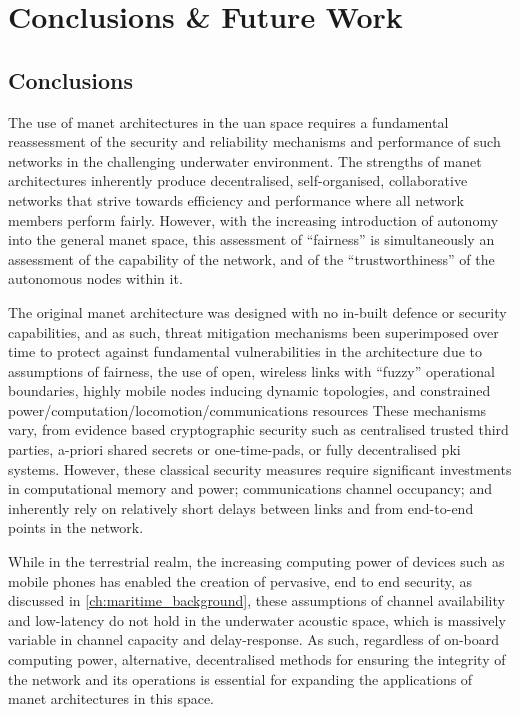 \def\ChapterTitle{Conclusions \& Future Work}

	\chapter{\ChapterTitle}
	\label{ch:conclusion}
	\lhead{Chapter \thechapter. \emph{\ChapterTitle}} %

\section{Conclusions}

The use of \gls{manet} architectures in the \gls{uan} space requires a fundamental reassessment of the security and reliability mechanisms and performance of such networks in the challenging underwater environment.
The strengths of \gls{manet} architectures inherently produce decentralised, self-organised, collaborative networks that strive towards efficiency and performance where all network members perform fairly.
However, with the increasing introduction of autonomy into the general \gls{manet} space, this assessment of ``fairness'' is simultaneously an assessment of the capability of the network, and of the ``trustworthiness'' of the autonomous nodes within it.

The original \gls{manet} architecture was designed with no in-built defence or security capabilities, and as such, threat mitigation mechanisms been superimposed over time to protect against fundamental vulnerabilities in the architecture due to assumptions of fairness, the use of open, wireless links with ``fuzzy'' operational boundaries, highly mobile nodes inducing dynamic topologies, and constrained power/computation/locomotion/communications resources
These mechanisms vary, from evidence based cryptographic security such as centralised trusted third parties, a-priori shared secrets or one-time-pads, or fully decentralised \gls{pki} systems.
However, these classical security measures require significant investments in computational memory and power; communications channel occupancy; and inherently rely on relatively short delays between links and from end-to-end points in the network.

While in the terrestrial realm, the increasing computing power of devices such as mobile phones has enabled the creation of pervasive, end to end security, as discussed in \autoref{ch:maritime_background}, these assumptions of channel availability and low-latency do not hold in the underwater acoustic space, which is massively variable in channel capacity and delay-response.
As such, regardless of on-board computing power, alternative, decentralised methods for ensuring the integrity of the network and its operations is essential for expanding the applications of \gls{manet} architectures in this space. 

